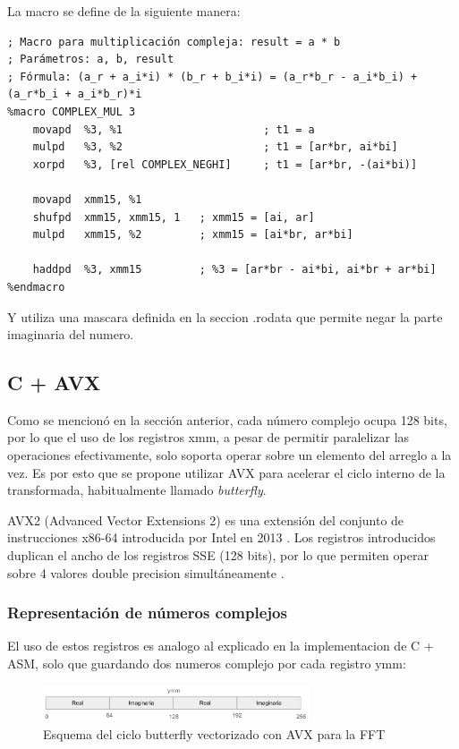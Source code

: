 \documentclass[a4paper]{article}
\begin{document}
La macro se define de la siguiente manera:

\begin{verbatim}
; Macro para multiplicación compleja: result = a * b
; Parámetros: a, b, result
; Fórmula: (a_r + a_i*i) * (b_r + b_i*i) = (a_r*b_r - a_i*b_i) + (a_r*b_i + a_i*b_r)*i
%macro COMPLEX_MUL 3
    movapd  %3, %1                      ; t1 = a
    mulpd   %3, %2                      ; t1 = [ar*br, ai*bi]
    xorpd   %3, [rel COMPLEX_NEGHI]     ; t1 = [ar*br, -(ai*bi)]

    movapd  xmm15, %1
    shufpd  xmm15, xmm15, 1   ; xmm15 = [ai, ar]
    mulpd   xmm15, %2         ; xmm15 = [ai*br, ar*bi]

    haddpd  %3, xmm15         ; %3 = [ar*br - ai*bi, ai*br + ar*bi]
%endmacro
\end{verbatim}

Y utiliza una mascara definida en la seccion .rodata que permite negar la parte imaginaria del numero.

\subsection{C + AVX}
Como se mencionó en la sección anterior, cada número complejo ocupa 128 bits, por lo que el uso de los registros xmm, a pesar de permitir paralelizar las operaciones efectivamente, solo soporta operar sobre un elemento del arreglo a la vez. Es por esto que se propone utilizar AVX para acelerar el ciclo interno de la transformada, habitualmente llamado \textit{butterfly}.

AVX2 (Advanced Vector Extensions 2) es una extensión del conjunto de instrucciones x86-64 introducida por Intel en 2013 \cite{intel2016intrinsics}. Los registros introducidos duplican el ancho
de los registros SSE (128 bits), por lo que permiten operar sobre 4 valores double precision simultáneamente \cite{fog2016optimizing}.

\subsubsection{Representación de números complejos}

El uso de estos registros es analogo al explicado en la implementacion de C + ASM, solo que guardando dos numeros complejo por cada registro ymm:

\begin{figure}[h]
    \centering
    \includegraphics[width=0.7\textwidth]{extra/ymm complex.png}
    \caption{Esquema del ciclo butterfly vectorizado con AVX para la FFT}
    \label{fig:avx_butterfly}
\end{figure}
\end{document}
